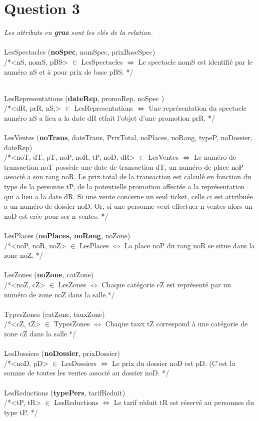 \documentclass[a4paper, 10pt, twoside]{article}
\begin{document}
\section{Question 3}
  \emph{Les attributs en \textbf{gras} sont les clés de la relation.}\\\\
  LesSpectacles (\textbf{noSpec}, nomSpec, prixBaseSpec)\\
  /*<nS, nomS, pBS> $\in$ LesSpectacles $\Longleftrightarrow$ Le spectacle nomS est identifié par le numéro nS et à pour prix de base pBS. */\\\\

\newpage
\thispagestyle{empty}

  LesRepresentations (\textbf{dateRep}, promoRep, noSpec )\\
  /*<dR, prR, nS,> $\in$ LesRepresentations $\Longleftrightarrow$ Une représentation du spectacle numéro nS a lieu a la date dR etfait l'objet d'une promotion prR. */\\\\
  LesVentes (\textbf{noTrans}, dateTrans, PrixTotal, noPlaces, noRang, typeP, noDossier, dateRep)\\
  /*<noT, dT, pT, noP, noR, tP, noD, dR> $\in$ LesVentes $\Longleftrightarrow$ Le numéro de transaction noT possède une date de transaction dT, un numéro de place noP associé a son rang noR. Le prix total de la transaction est calculé en fonction du type de la personne tP, de la potentielle promotion affectée a la représentation qui a lieu a la date dR. Si une vente concerne un seul ticket, celle ci est attribuée a un numéro de dossier noD. Or, si une personne veut effectuer n ventes alors un noD est crée pour ses n ventes. */\\\\
  LesPlaces (\textbf{noPlaces, noRang}, noZone)\\
  /*<noP, noR, noZ> $\in$ LesPlaces $\Longleftrightarrow$ La place noP du rang noR se situe dans la zone noZ. */\\\\
  LesZones (\textbf{noZone}, catZone)\\
  /*<noZ, cZ> $\in$ LesZones $\Longleftrightarrow$ Chaque catégorie cZ est représenté par un numéro de zone noZ dans la salle.*/\\\\
  TypesZones (catZone, tauxZone)\\
  /*<cZ, tZ> $\in$ TypesZones $\Longleftrightarrow$ Chaque taux tZ correspond à une catégorie de zone cZ dans la salle.*/\\\\
  LesDossiers (\textbf{noDossier}, prixDossier)\\
  /*<noD, pD> $\in$ LesDossiers $\Longleftrightarrow$ Le prix du dossier noD est pD. (C'est la somme de toutes les ventes associé au dossier noD. */\\\\
  LesReductions (\textbf{typePers}, tarifReduit)\\
  /*<tP, tR> $\in$ LesReductions $\Longleftrightarrow$ Le tarif réduit tR est réservé au personnes du type tP. */\\\\
\end{document}
